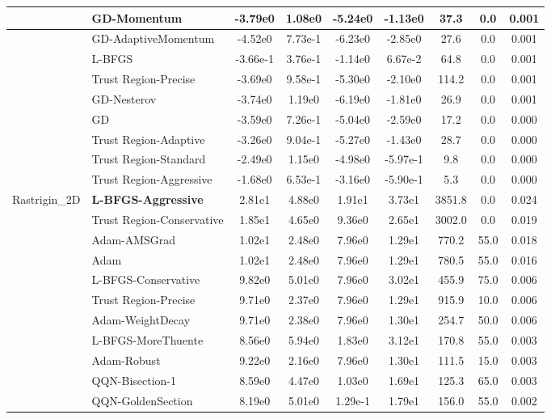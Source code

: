 \documentclass{article}
\begin{document}
\begin{longtable}{|l|l|c|c|c|c|c|c|c|}
\hline
 & GD-Momentum & -3.79e0 & 1.08e0 & -5.24e0 & -1.13e0 & 37.3 & 0.0 & 0.001 \\
\hline
 & GD-AdaptiveMomentum & -4.52e0 & 7.73e-1 & -6.23e0 & -2.85e0 & 27.6 & 0.0 & 0.001 \\
\hline
 & L-BFGS & -3.66e-1 & 3.76e-1 & -1.14e0 & 6.67e-2 & 64.8 & 0.0 & 0.001 \\
\hline
 & Trust Region-Precise & -3.69e0 & 9.58e-1 & -5.30e0 & -2.10e0 & 114.2 & 0.0 & 0.001 \\
\hline
 & GD-Nesterov & -3.74e0 & 1.19e0 & -6.19e0 & -1.81e0 & 26.9 & 0.0 & 0.001 \\
\hline
 & GD & -3.59e0 & 7.26e-1 & -5.04e0 & -2.59e0 & 17.2 & 0.0 & 0.000 \\
\hline
 & Trust Region-Adaptive & -3.26e0 & 9.04e-1 & -5.27e0 & -1.43e0 & 28.7 & 0.0 & 0.000 \\
\hline
 & Trust Region-Standard & -2.49e0 & 1.15e0 & -4.98e0 & -5.97e-1 & 9.8 & 0.0 & 0.000 \\
\hline
 & Trust Region-Aggressive & -1.68e0 & 6.53e-1 & -3.16e0 & -5.90e-1 & 5.3 & 0.0 & 0.000 \\
Rastrigin\_2D & \textbf{L-BFGS-Aggressive} & 2.81e1 & 4.88e0 & 1.91e1 & 3.73e1 & 3851.8 & 0.0 & 0.024 \\
\hline
 & Trust Region-Conservative & 1.85e1 & 4.65e0 & 9.36e0 & 2.65e1 & 3002.0 & 0.0 & 0.019 \\
\hline
 & Adam-AMSGrad & 1.02e1 & 2.48e0 & 7.96e0 & 1.29e1 & 770.2 & 55.0 & 0.018 \\
\hline
 & Adam & 1.02e1 & 2.48e0 & 7.96e0 & 1.29e1 & 780.5 & 55.0 & 0.016 \\
\hline
 & L-BFGS-Conservative & 9.82e0 & 5.01e0 & 7.96e0 & 3.02e1 & 455.9 & 75.0 & 0.006 \\
\hline
 & Trust Region-Precise & 9.71e0 & 2.37e0 & 7.96e0 & 1.29e1 & 915.9 & 10.0 & 0.006 \\
\hline
 & Adam-WeightDecay & 9.71e0 & 2.38e0 & 7.96e0 & 1.30e1 & 254.7 & 50.0 & 0.006 \\
\hline
 & L-BFGS-MoreThuente & 8.56e0 & 5.94e0 & 1.83e0 & 3.12e1 & 170.8 & 55.0 & 0.003 \\
\hline
 & Adam-Robust & 9.22e0 & 2.16e0 & 7.96e0 & 1.30e1 & 111.5 & 15.0 & 0.003 \\
\hline
 & QQN-Bisection-1 & 8.59e0 & 4.47e0 & 1.03e0 & 1.69e1 & 125.3 & 65.0 & 0.003 \\
\hline
 & QQN-GoldenSection & 8.19e0 & 5.01e0 & 1.29e-1 & 1.79e1 & 156.0 & 55.0 & 0.002 \\

\end{longtable}
\end{document}
